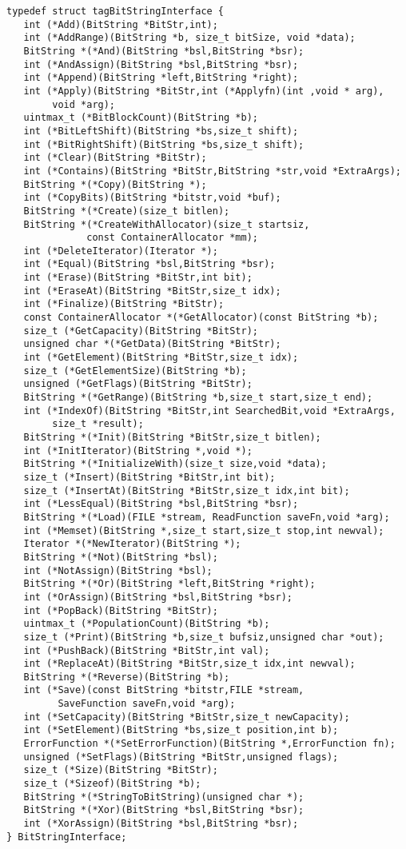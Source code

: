 \begin{verbatim}
typedef struct tagBitStringInterface {
   int (*Add)(BitString *BitStr,int);
   int (*AddRange)(BitString *b, size_t bitSize, void *data);
   BitString *(*And)(BitString *bsl,BitString *bsr);
   int (*AndAssign)(BitString *bsl,BitString *bsr);
   int (*Append)(BitString *left,BitString *right);
   int (*Apply)(BitString *BitStr,int (*Applyfn)(int ,void * arg),
        void *arg);
   uintmax_t (*BitBlockCount)(BitString *b);
   int (*BitLeftShift)(BitString *bs,size_t shift);
   int (*BitRightShift)(BitString *bs,size_t shift);
   int (*Clear)(BitString *BitStr);
   int (*Contains)(BitString *BitStr,BitString *str,void *ExtraArgs);
   BitString *(*Copy)(BitString *);
   int (*CopyBits)(BitString *bitstr,void *buf);
   BitString *(*Create)(size_t bitlen);
   BitString *(*CreateWithAllocator)(size_t startsiz,
              const ContainerAllocator *mm);
   int (*DeleteIterator)(Iterator *);
   int (*Equal)(BitString *bsl,BitString *bsr);
   int (*Erase)(BitString *BitStr,int bit);
   int (*EraseAt)(BitString *BitStr,size_t idx);
   int (*Finalize)(BitString *BitStr);
   const ContainerAllocator *(*GetAllocator)(const BitString *b);
   size_t (*GetCapacity)(BitString *BitStr);
   unsigned char *(*GetData)(BitString *BitStr);
   int (*GetElement)(BitString *BitStr,size_t idx);
   size_t (*GetElementSize)(BitString *b);
   unsigned (*GetFlags)(BitString *BitStr); 
   BitString *(*GetRange)(BitString *b,size_t start,size_t end);
   int (*IndexOf)(BitString *BitStr,int SearchedBit,void *ExtraArgs,
        size_t *result);
   BitString *(*Init)(BitString *BitStr,size_t bitlen);
   int (*InitIterator)(BitString *,void *);
   BitString *(*InitializeWith)(size_t size,void *data);
   size_t (*Insert)(BitString *BitStr,int bit);
   size_t (*InsertAt)(BitString *BitStr,size_t idx,int bit);
   int (*LessEqual)(BitString *bsl,BitString *bsr);
   BitString *(*Load)(FILE *stream, ReadFunction saveFn,void *arg);
   int (*Memset)(BitString *,size_t start,size_t stop,int newval);
   Iterator *(*NewIterator)(BitString *);
   BitString *(*Not)(BitString *bsl);
   int (*NotAssign)(BitString *bsl);
   BitString *(*Or)(BitString *left,BitString *right);
   int (*OrAssign)(BitString *bsl,BitString *bsr);
   int (*PopBack)(BitString *BitStr);
   uintmax_t (*PopulationCount)(BitString *b);
   size_t (*Print)(BitString *b,size_t bufsiz,unsigned char *out);
   int (*PushBack)(BitString *BitStr,int val);
   int (*ReplaceAt)(BitString *BitStr,size_t idx,int newval);
   BitString *(*Reverse)(BitString *b);
   int (*Save)(const BitString *bitstr,FILE *stream,
         SaveFunction saveFn,void *arg);
   int (*SetCapacity)(BitString *BitStr,size_t newCapacity);
   int (*SetElement)(BitString *bs,size_t position,int b);
   ErrorFunction *(*SetErrorFunction)(BitString *,ErrorFunction fn);
   unsigned (*SetFlags)(BitString *BitStr,unsigned flags);
   size_t (*Size)(BitString *BitStr); 
   size_t (*Sizeof)(BitString *b);
   BitString *(*StringToBitString)(unsigned char *);
   BitString *(*Xor)(BitString *bsl,BitString *bsr);
   int (*XorAssign)(BitString *bsl,BitString *bsr);
} BitStringInterface;
\end{verbatim}
